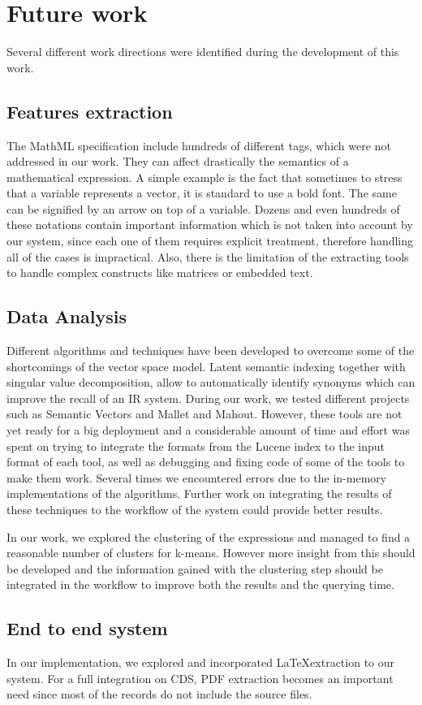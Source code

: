 \chapter{Future work}
\label{chap-future_work}

Several different work directions were identified during the development of this work. 

\section{Features extraction}
The MathML specification include hundreds of different tags, which were not addressed in our work. They can affect drastically the semantics of a mathematical expression. A simple example is the fact that sometimes to stress that a variable represents a vector, it is standard to use a bold font. The same can be signified by an arrow on top of a variable. Dozens and even hundreds of these notations contain important information which is not taken into account by our system, since each one of them requires explicit treatment, therefore handling all of the cases is impractical. Also, there is the limitation of the extracting tools to handle complex constructs like matrices or embedded text.

\section{Data Analysis}
Different algorithms and techniques have been developed to overcome some of the shortcomings of the vector space model. Latent semantic indexing together with singular value decomposition, allow to automatically identify synonyms which can improve the recall of an IR system. During our work, we tested different projects such as Semantic Vectors\cite{semantic_vectors} and Mallet\cite{mallet} and Mahout. However, these tools are not yet ready for a big deployment and a considerable amount of time and effort was spent on trying to integrate the formats from the Lucene index to the input format of each tool, as well as debugging and fixing code of some of the tools to make them work. Several times we encountered errors due to the in-memory implementations of the algorithms. Further work on integrating the results of these techniques to the workflow of the system could provide better results. 

In our work, we explored the clustering of the expressions and managed to find a reasonable number of clusters for k-means. However more insight from this should be developed and the information gained with the clustering step should be integrated in the workflow to improve both the results and the querying time. 

\section{End to end system}
In our implementation, we explored and incorporated \LaTeX extraction to our system. For a full integration on CDS, PDF extraction becomes an important need since most of the records do not include the source files.
